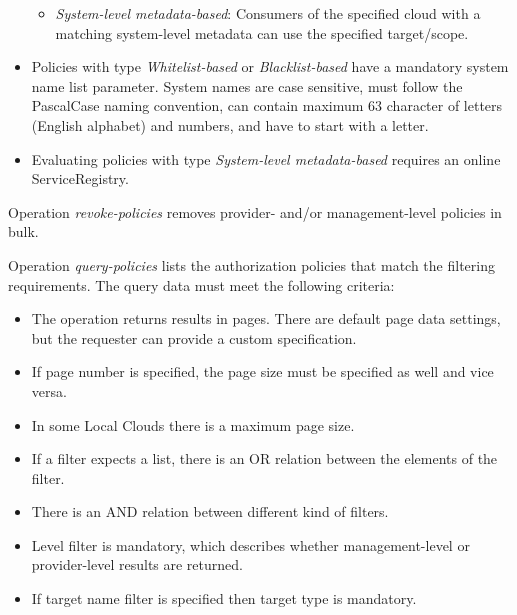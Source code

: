 \documentclass[a4paper]{arrowhead}
\begin{document}
\begin{itemize}
\begin{itemize}
            \item \textit{System-level metadata-based}: Consumers of the specified cloud with a matching system-level metadata can use the specified target/scope.
        \end{itemize}
    \item Policies with type \textit{Whitelist-based} or \textit{Blacklist-based} have a mandatory system name list parameter. System names are case sensitive, must follow the PascalCase naming convention, can contain maximum 63 character of letters (English alphabet) and numbers, and have to start with a letter.
    \item Evaluating policies with type \textit{System-level metadata-based} requires an online ServiceRegistry.
\end{itemize}


Operation \textit{revoke-policies} removes provider- and/or management-level policies in bulk.


Operation \textit{query-policies} lists the authorization policies that match the filtering requirements. The query data must meet the following criteria:

\begin{itemize}
    \item The operation returns results in pages. There are default page data settings, but the requester can provide a custom specification.
    \item If page number is specified, the page size must be specified as well and vice versa.
    \item In some Local Clouds there is a maximum page size.
    \item If a filter expects a list, there is an OR relation between the elements of the filter.
    \item There is an AND relation between different kind of filters.
    \item Level filter is mandatory, which describes whether management-level or provider-level results are returned.
    \item If target name filter is specified then target type is mandatory.
\end{itemize}

\end{document}
